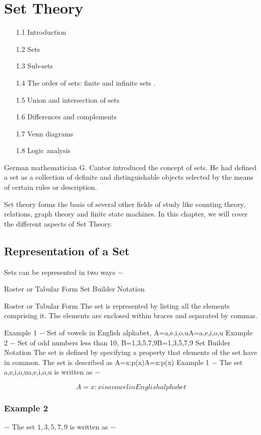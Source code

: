 \documentclass[12pt]{article}
\begin{document}
\section*{Set Theory}
\Large
\begin{itemize}
\item[1.1] Introduction  
\item[1.2] Sets  
\item[1.3] Sub-sets  
\item[1.4] The order of sets: finite and infinite sets .
\item[1.5] Union and intersection of sets  
\item[1.6] Differences and complements  
\item[1.7] Venn diagrams  
\item[1.8] Logic analysis
\end{itemize}  
\newpage
German mathematician G. Cantor introduced the concept of sets. He had defined a set as a collection of definite and distinguishable objects selected by the means of certain rules or description.

Set theory forms the basis of several other fields of study like counting theory, relations, graph theory and finite state machines. In this chapter, we will cover the different aspects of Set Theory.


\subsection{Representation of a Set}
Sets can be represented in two ways −

Roster or Tabular Form
Set Builder Notation

Roster or Tabular Form
The set is represented by listing all the elements comprising it. The elements are enclosed within braces and separated by commas.

Example 1 − Set of vowels in English alphabet, A={a,e,i,o,u}A={a,e,i,o,u}
Example 2 − Set of odd numbers less than 10, B={1,3,5,7,9}B={1,3,5,7,9}
Set Builder Notation
The set is defined by specifying a property that elements of the set have in common. The set is described as A={x:p(x)}A={x:p(x)}
Example 1 − The set {a,e,i,o,u}{a,e,i,o,u} is written as −

\[A={x:x is a vowel in English alphabet}\]
\subsubsection*{Example 2} − The set ${1,3,5,7,9}$ is written as −
\end{document}
